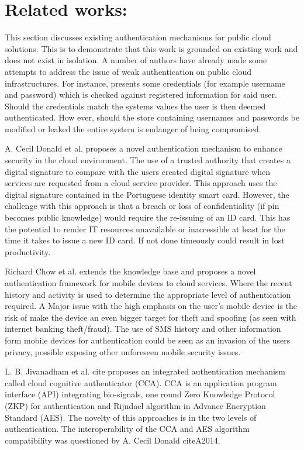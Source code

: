 \documentclass[11pt]{article}
\begin{document}
\section{Related works:}
This section discusses existing authentication mechanisms for public cloud solutions. This is to demonstrate that this work is grounded on existing work and does not exist in isolation. A number of authors have already made some attempts to address the issue of weak authentication on public cloud infrastructures. For instance, \cite{Archer2009} presents some credentials (for example username and password) which is checked against registered information for said user. Should the credentials match the systems values the user is then deemed authenticated. How ever, should the store containing usernames and passwords be modified or leaked the entire system is endanger of being compromised.   

A. Cecil Donald et al. \cite{A2014} proposes a novel authentication  mechanism to enhance security in the cloud environment. The use of a trusted authority that creates a digital signature to compare with the users created digital signature when services are requested from a cloud service provider. This approach uses the digital signature  contained in the Portuguese identity smart card. However, the challenge with this approach is that a breach or loss of confidentiality (if pin becomes public knowledge) would require the re-issuing of an ID card. This has the potential to render IT resources unavailable or inaccessible at least for the time it takes to issue a new ID card. If not done timeously could result in lost productivity.

Richard Chow et al. \cite{Chow2010} extends the knowledge base and proposes a novel authentication framework for mobile devices to cloud services. Where the recent history and activity is used to determine the appropriate level of authentication required. A Major issue with the high emphasis on the user's mobile device is the risk of make the device an even bigger target for theft and spoofing (as seen with internet banking theft/fraud). The use of SMS history and other information form mobile devices for authentication could be seen as an invasion of the users privacy, possible exposing other unforeseen mobile security issues.

L. B. Jivanadham et al. cite{} proposes an integrated authentication mechanism called cloud cognitive authenticator (CCA). CCA is an application program interface (API) integrating bio-signals, one round Zero Knowledge Protocol (ZKP) for authentication and Rijndael algorithm in Advance Encryption Standard (AES). The novelty of this approaches is in the two levels of authentication. The interoperability of the CCA and AES algorithm compatibility was questioned by A. Cecil Donald cite{A2014}.   
\end{document}
